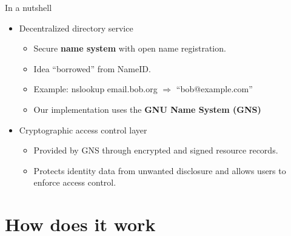 \documentclass[aspectratio=169]{beamer}
\let\oldemph\textbf
\renewcommand{\textbf}[1]{{\color{mLightBrown}\oldemph{#1}}}
\begin{document}
\begin{frame}{In a nutshell}
  \begin{itemize}
    \item Decentralized directory service
      \begin{itemize}
        \item Secure \textbf{name system} with open name registration.
        \item Idea ``borrowed'' from NameID.
        \item Example: nslookup email.bob.org $\Rightarrow$ ``bob@example.com''
        \item Our implementation uses the \textbf{GNU Name System (GNS)}
      \end{itemize}
      \pause
    \item Cryptographic access control layer
      \begin{itemize}
        \item Provided by GNS through encrypted and signed resource records.
        \item Protects identity data from unwanted disclosure and allows users to enforce access control.
      \end{itemize}
  \end{itemize}
\end{frame}

%


\section{How does it work}
\end{document}
